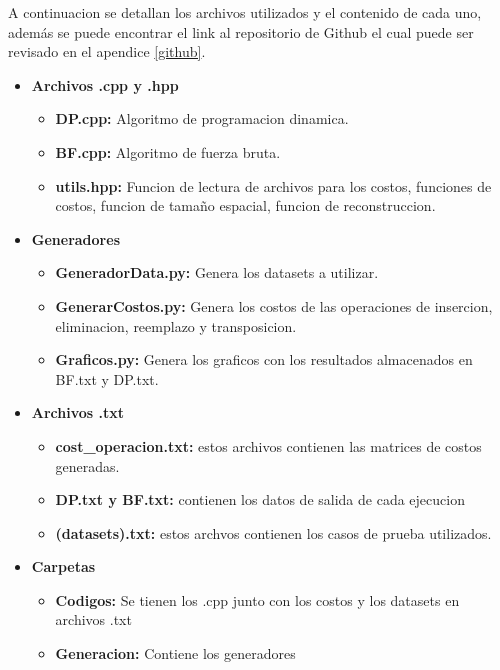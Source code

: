 A continuacion se detallan los archivos utilizados y el contenido de cada uno, además se puede encontrar el link al repositorio
de Github el cual puede ser revisado en el apendice \ref{github}. 

\begin{itemize}
    \item \textbf{Archivos .cpp y .hpp}
    \begin{itemize}
        \item \textbf{DP.cpp:} Algoritmo de programacion dinamica.
        \item \textbf{BF.cpp:} Algoritmo de fuerza bruta.
        \item \textbf{utils.hpp:} Funcion de lectura de archivos para los costos, funciones de costos, funcion de tamaño espacial, funcion de reconstruccion.
    \end{itemize}
    \item \textbf{Generadores}
    \begin{itemize}
        \item \textbf{GeneradorData.py: } Genera los datasets a utilizar.
        \item \textbf{GenerarCostos.py: } Genera los costos de las operaciones de insercion, eliminacion, reemplazo y transposicion.
        \item \textbf{Graficos.py: } Genera los graficos con los resultados almacenados en BF.txt y DP.txt.
    \end{itemize}
    \item \textbf{Archivos .txt}
    \begin{itemize}
        \item \textbf{cost\_operacion.txt: } estos archivos contienen las matrices de costos generadas. 
        \item \textbf{DP.txt y BF.txt: } contienen los datos de salida de cada ejecucion
        \item \textbf{(datasets).txt: } estos archvos contienen los casos de prueba utilizados.
    \end{itemize}
    \item \textbf{Carpetas}
    \begin{itemize}
        \item \textbf{Codigos: } Se tienen los .cpp junto con los costos y los datasets en archivos .txt  
        \item \textbf{Generacion: } Contiene los generadores
    \end{itemize}
\end{itemize}
